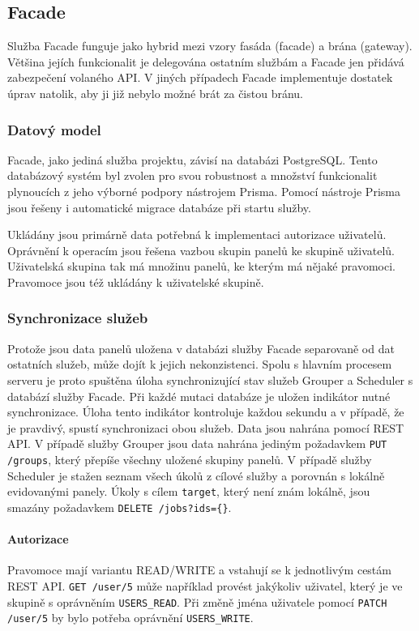 \subsection{Facade}
Služba Facade funguje jako hybrid mezi vzory fasáda (facade) a brána (gateway). Většina jejích funkcionalit je delegována ostatním službám a Facade jen přidává zabezpečení volaného API. V jiných případech Facade implementuje dostatek úprav natolik, aby ji již nebylo možné brát za čistou bránu.

\subsubsection{Datový model}
Facade, jako jediná služba projektu, závisí na databázi PostgreSQL. Tento databázový systém byl zvolen pro svou robustnost a množství funkcionalit plynoucích z jeho výborné podpory nástrojem Prisma. Pomocí nástroje Prisma jsou řešeny i automatické migrace databáze při startu služby.

Ukládány jsou primárně data potřebná k implementaci autorizace uživatelů. Oprávnění k operacím jsou řešena vazbou skupin panelů ke skupině uživatelů. Uživatelská skupina tak má množinu panelů, ke kterým má nějaké pravomoci. Pravomoce jsou též ukládány k uživatelské skupině.

\subsubsection{Synchronizace služeb}
Protože jsou data panelů uložena v databázi služby Facade separovaně od dat ostatních služeb, může dojít k jejich nekonzistenci. Spolu s hlavním procesem serveru je proto spuštěna úloha synchronizující stav služeb Grouper a Scheduler s databází služby Facade. Při každé mutaci databáze je uložen indikátor nutné synchronizace. Úloha tento indikátor kontroluje každou sekundu a v případě, že je pravdivý, spustí synchronizaci obou služeb. Data jsou nahrána pomocí REST API. V případě služby Grouper jsou data nahrána jediným požadavkem \lstinline|PUT /groups|, který přepíše všechny uložené skupiny panelů. V případě služby Scheduler je stažen seznam všech úkolů z cílové služby a porovnán s lokálně evidovanými panely. Úkoly s cílem \lstinline|target|, který není znám lokálně, jsou smazány požadavkem \lstinline|DELETE /jobs?ids={}|.

\paragraph{Autorizace}
Pravomoce mají variantu READ/WRITE a vstahují se k jednotlivým cestám REST API. \lstinline|GET /user/5| může například provést jakýkoliv uživatel, který je ve skupině s oprávněním \lstinline{USERS_READ}. Při změně jména uživatele pomocí \lstinline|PATCH /user/5| by bylo potřeba oprávnění \lstinline{USERS_WRITE}.

